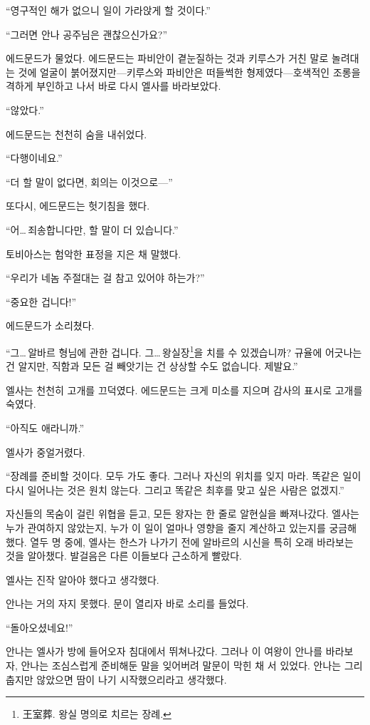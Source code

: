 ``영구적인 해가 없으니 일이 가라앉게 할 것이다.''

``그러면 안나 공주님은 괜찮으신가요?''

에드문드가 물었다. 에드문드는 파비안이 곁눈질하는 것과 키루스가 거친 말로 놀려대는 것에 얼굴이 붉어졌지만—키루스와 파비안은 떠들썩한 형제였다—호색적인 조롱을 격하게 부인하고 나서 바로 다시 엘사를 바라보았다.

`` 않았다.''

에드문드는 천천히 숨을 내쉬었다.

``다행이네요.''

``더 할 말이 없다면, 회의는 이것으로—''

또다시, 에드문드는 헛기침을 했다.

``어\ldots\,죄송합니다만, 할 말이 더 있습니다.''

토비아스는 험악한 표정을 지은 채 말했다.

``우리가 네놈 주절대는 걸 참고 있어야 하는가?''

``중요한 겁니다!''

에드문드가 소리쳤다.

``그\ldots\,알바르 형님에 관한 겁니다. 그\ldots\,왕실장\footnote{王室葬. 왕실 명의로 치르는 장례.}을 치를 수 있겠습니까? 규율에 어긋나는 건 알지만, 직함과 모든 걸 빼앗기는 건 상상할 수도 없습니다. 제발요.''

엘사는 천천히 고개를 끄덕였다. 에드문드는 크게 미소를 지으며 감사의 표시로 고개를 숙였다.

``아직도 애라니까.''

엘사가 중얼거렸다.

``장례를 준비할 것이다. 모두 가도 좋다. 그러나 자신의 위치를 잊지 마라. 똑같은 일이 다시 일어나는 것은 원치 않는다. 그리고 똑같은 최후를 맞고 싶은 사람은 없겠지.''

자신들의 목숨이 걸린 위협을 듣고, 모든 왕자는 한 줄로 알현실을 빠져나갔다. 엘사는 누가 관여하지 않았는지, 누가 이 일이 얼마나 영향을 줄지 계산하고 있는지를 궁금해했다. 열두 명 중에, 엘사는 한스가 나가기 전에 알바르의 시신을 특히 오래 바라보는 것을 알아챘다. 발걸음은 다른 이들보다 근소하게 빨랐다.

엘사는 진작 알아야 했다고 생각했다.

\textbreak

안나는 거의 자지 못했다. 문이 열리자 바로 소리를 들었다.

``돌아오셨네요!''

안나는 엘사가 방에 들어오자 침대에서 뛰쳐나갔다. 그러나 이 여왕이 안나를 바라보자, 안나는 조심스럽게 준비해둔 말을 잊어버려 말문이 막힌 채 서 있었다. 안나는 그리 춥지만 않았으면 땀이 나기 시작했으리라고 생각했다.


